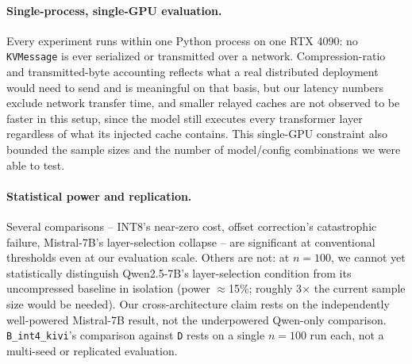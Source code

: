 \documentclass[11pt]{article}
\begin{document}
\paragraph{Single-process, single-GPU evaluation.} Every experiment runs
within one Python process on one RTX 4090: no \texttt{KVMessage} is ever
serialized or transmitted over a network. Compression-ratio and
transmitted-byte accounting reflects what a real distributed deployment
would need to send and is meaningful on that basis, but our latency
numbers exclude network transfer time, and smaller relayed caches are not
observed to be faster in this setup, since the model still executes every
transformer layer regardless of what its injected cache contains. This
single-GPU constraint also bounded the sample sizes and the number of
model/config combinations we were able to test.

\paragraph{Statistical power and replication.} Several comparisons --
INT8's near-zero cost, offset correction's catastrophic failure,
Mistral-7B's layer-selection collapse -- are significant at conventional
thresholds even at our evaluation scale. Others are not: at $n=100$, we
cannot yet statistically distinguish Qwen2.5-7B's layer-selection
condition from its uncompressed baseline in isolation (power
$\approx$15\%; roughly 3$\times$ the current sample size would be
needed). Our cross-architecture claim rests on the independently
well-powered Mistral-7B result, not the underpowered Qwen-only
comparison. \texttt{B\_int4\_kivi}'s comparison against \texttt{D} rests
on a single $n=100$ run each, not a multi-seed or replicated evaluation.
\end{document}
